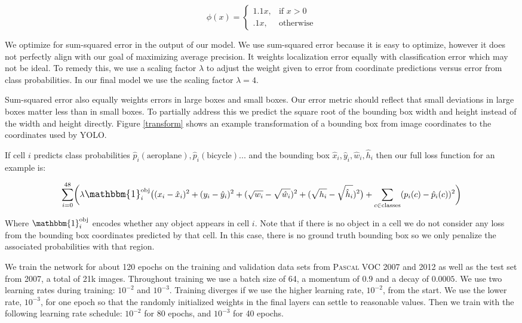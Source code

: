\documentclass{article} %
\begin{document}
\begin{equation}
\phi(x) =
\begin{cases}
    1.1x, & \text{if } x > 0\\
    .1x, & \text{otherwise}
    \end{cases}
\end{equation}

We optimize for sum-squared error in the output of our model. We use sum-squared error because it is easy to optimize, however it does not perfectly align with our goal of maximizing average precision. It weights localization error equally with classification error which may not be ideal. To remedy this, we use a scaling factor $\lambda$ to adjust the weight given to error from coordinate predictions versus error from class probabilities. In our final model we use the scaling factor $\lambda = 4$.

Sum-squared error also equally weights errors in large boxes and small boxes. Our error metric should reflect that small deviations in large boxes matter less than in small boxes. To partially address this we predict the square root of the bounding box width and height instead of the width and height directly. Figure \ref{transform} shows an example transformation of a bounding box from image coordinates to the coordinates used by YOLO.

If cell $i$ predicts class probabilities $\hat{p}_i(\text{aeroplane}), \hat{p}_i(\text{bicycle})...$ and the bounding box $\hat{x}_i,\hat{y}_i, \hat{w}_i, \hat{h}_i$ then our full loss function for an example is:

\begin{equation}
\sum_{i = 0}^{48} \biggl( \lambda \mathlarger{\mathbbm{1}}_i^{\text{obj}}\bigl((x_i - \hat{x}_i)^2 + (y_i - \hat{y}_i)^2 + (\sqrt{w_i} - \sqrt{\hat{w}_i})^2 + (\sqrt{h_i} - \sqrt{\hat{h}_i})^2\bigr) + \sum_{c \in \text{classes}} (p_i(c) - \hat{p}_i(c))^2 \biggr)
\end{equation}

Where $\mathbbm{1}_i^{\text{obj}}$ encodes whether any object appears in cell $i$. Note that if there is no object in a cell we do not consider any loss from the bounding box coordinates predicted by that cell. In this case, there is no ground truth bounding box so we only penalize the associated probabilities with that region.

We train the network for about 120 epochs on the training and validation data sets from \textsc{Pascal} VOC 2007 and 2012 as well as the test set from 2007, a total of 21k images. Throughout training we use a batch size of 64, a momentum of $0.9$ and a decay of $0.0005$. We use two learning rates during training: $10^{-2}$ and $10^{-3}$. Training diverges if we use the higher learning rate, $10^{-2}$, from the start. We use the lower rate, $10^{-3}$, for one epoch so that the randomly initialized weights in the final layers can settle to reasonable values. Then we train with the following learning rate schedule: $10^{-2}$ for 80 epochs, and $10^{-3}$ for 40 epochs.
\end{document}
